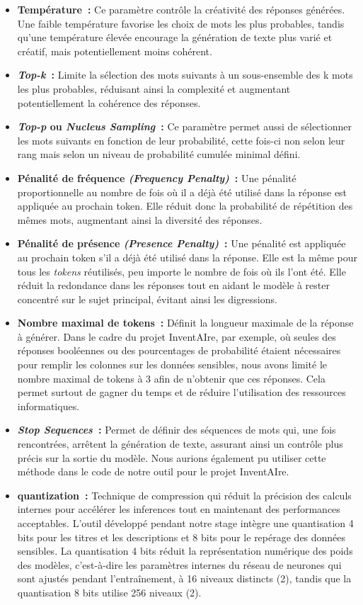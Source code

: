 \begin{itemize}
	\item \textbf{Température~:} Ce paramètre contrôle la créativité des réponses générées. Une faible température favorise les choix de mots les plus probables, tandis qu'une température élevée encourage la génération de texte plus varié et créatif, mais potentiellement moins cohérent.
	\item \textbf{\emph{Top-k}~:} Limite la sélection des mots suivants à un sous-ensemble des k mots les plus probables, réduisant ainsi la complexité et augmentant potentiellement la cohérence des réponses.
	\item \textbf{\emph{Top-p} ou \emph{Nucleus Sampling}~:} Ce paramètre permet aussi de sélectionner les mots suivants en fonction de leur probabilité, cette fois-ci non selon leur rang mais selon un niveau de probabilité cumulée minimal défini.
	\item \textbf{Pénalité de fréquence \emph{(Frequency Penalty)}~:} Une pénalité proportionnelle au nombre de fois où il a déjà été utilisé dans la réponse est appliquée au prochain \gls{token}. Elle réduit donc la probabilité de répétition des mêmes mots, augmentant ainsi la diversité des réponses.
	\item \textbf{Pénalité de présence \emph{(Presence Penalty)}~:} Une pénalité est appliquée au prochain \gls{token} s'il a déjà été utilisé dans la réponse. Elle est la même pour tous les \emph{tokens} réutilisés, peu importe le nombre de fois où ils l'ont été. Elle réduit la redondance dans les réponses tout en aidant le modèle à rester concentré sur le sujet principal, évitant ainsi les digressions.
	\item \textbf{Nombre maximal de \gls{token}s~:}  Définit la longueur maximale de la réponse à générer. Dans le cadre du projet InventAIre, par exemple, où seules des réponses booléennes ou des pourcentages de probabilité étaient nécessaires pour remplir les colonnes sur les données sensibles, nous avons limité le nombre maximal de tokens à 3 afin de n'obtenir que ces réponses. Cela permet surtout de gagner du temps et de réduire l'utilisation des ressources informatiques.
	\item \textbf{\emph{Stop Sequences}~:} Permet de définir des séquences de mots qui, une fois rencontrées, arrêtent la génération de texte, assurant ainsi un contrôle plus précis sur la sortie du modèle. Nous aurions également pu utiliser cette méthode dans le code de notre outil pour le projet InventAIre. 
	\item \textbf{\gls{quantization}~:} Technique de compression qui réduit la précision des calculs internes pour accélérer les \gls{inference}s tout en maintenant des performances acceptables. L'outil développé pendant notre stage intègre une quantisation 4 bits pour les titres et les descriptions et 8 bits pour le repérage des données sensibles. La quantisation 4 bits réduit la représentation numérique des poids des modèles, c'est-à-dire les paramètres internes du réseau de neurones qui sont ajustés pendant l'entraînement, à 16 niveaux distincts (2), tandis que la quantisation 8 bits utilise 256 niveaux (2).
	\end{itemize}

